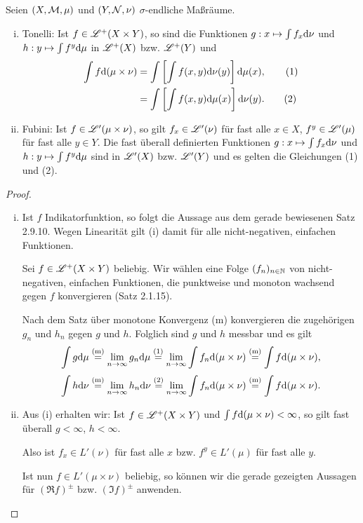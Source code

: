 \documentclass[
 a4paper,
 12pt,
 parskip=half
 ]{scrreprt}
\theoremstyle{plain}
\theoremstyle{definition}
\numberwithin{equation}{section}
\begin{document}
\begin{thm}
 Seien $(X,\mathcal{M},\mu)$ und $(Y,\mathcal{N},\nu)$ $\sigma$-endliche Maßräume.
 
 \begin{enumerate}[(i)]
  \item Tonelli: Ist $f \in \mathscr{L}^+(X \times Y)$, so sind die Funktionen $g:x \mapsto \int f_x \mathrm{d} \nu$ und $h:y \mapsto \int f^y \mathrm{d} \mu$ in $\mathscr{L}^+(X)$ bzw. $\mathscr{L}^+(Y)$ und
  \begin{align*}
   \int f \mathrm{d} (\mu \times \nu)
     &= \int \left[ \int f(x,y) \mathrm{d} \nu(y) \right] \mathrm{d} \mu(x), \tag{1} \\
     &= \int \left[ \int f(x,y) \mathrm{d} \mu(x) \right] \mathrm{d} \nu(y). \tag{2}
  \end{align*}
  \item Fubini: Ist $f \in \mathscr{L}'(\mu \times \nu)$, so gilt $f_x \in \mathscr{L}'(\nu)$ für fast alle $x \in X$, $f^y \in \mathscr{L}'(\mu)$ für fast alle $y \in Y$. Die fast überall definierten Funktionen $g:x \mapsto \int f_x \mathrm{d} \nu$ und $h:y \mapsto \int f^y \mathrm{d} \mu$ sind in $\mathscr{L}'(X)$ bzw. $\mathscr{L}'(Y)$ und es gelten die Gleichungen (1) und (2).
 \end{enumerate}
\end{thm}

\begin{proof}
 \begin{enumerate}[(i)]
  \item Ist $f$ Indikatorfunktion, so folgt die Aussage aus dem gerade bewiesenen Satz 2.9.10. Wegen Linearität gilt (i) damit für alle nicht-negativen, einfachen Funktionen.
 
  Sei $f \in \mathscr{L}^+(X \times Y)$ beliebig. Wir wählen eine Folge $(f_n)_{n \in \mathbb{N}}$ von nicht-negativen, einfachen Funktionen, die punktweise und monoton wachsend gegen $f$ konvergieren (Satz 2.1.15).
  
  Nach dem Satz über monotone Konvergenz (m) konvergieren die zugehörigen $g_n$ und $h_n$ gegen $g$ und $h$. Folglich sind $g$ und $h$ messbar und es gilt
  \[ \int g \mathrm{d} \mu \overset{(\text{m})}{=} \lim_{n \to \infty} g_n \mathrm{d} \mu \overset{(1)}{=} \lim_{n \to \infty} \int f_n \mathrm{d} (\mu \times \nu) \overset{(\text{m})}{=} \int f \mathrm{d} (\mu \times \nu), \]
  \[ \int h \mathrm{d} \nu \overset{(\text{m})}{=} \lim_{n \to \infty} h_n \mathrm{d} \nu \overset{(2)}{=} \lim_{n \to \infty} \int f_n \mathrm{d} (\mu \times \nu) \overset{(\text{m})}{=} \int f \mathrm{d} (\mu \times \nu). \]
  \item Aus (i) erhalten wir: Ist $f \in \mathscr{L}^+ (X \times Y)$ und $\int f \mathrm{d} (\mu \times \nu) < \infty$, so gilt fast überall $g < \infty$, $h < \infty$.
  
  Also ist $f_x \in L'(\nu)$ für fast alle $x$ bzw. $f^y \in L'(\mu)$ für fast alle $y$.
  
  Ist nun $f \in L'(\mu \times \nu)$ beliebig, so können wir die gerade gezeigten Aussagen für $(\Re f)^\pm$ bzw. $(\Im f)^\pm$ anwenden.
  \qedhere
 \end{enumerate}
\end{proof}
\end{document}
